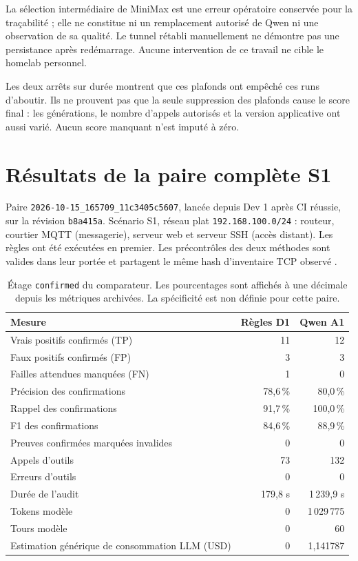 \documentclass[11pt,a4paper]{article}
\newcommand{\code}[1]{\nolinkurl{#1}}
\begin{document}
La sélection intermédiaire de MiniMax est une erreur opératoire conservée pour
la traçabilité ; elle ne constitue ni un remplacement autorisé de Qwen ni une
observation de sa qualité. Le tunnel rétabli manuellement ne démontre pas une
persistance après redémarrage. Aucune intervention de ce travail ne cible le
homelab personnel.

Les deux arrêts sur durée montrent que ces plafonds ont empêché ces runs
d'aboutir. Ils ne prouvent pas que la seule suppression des plafonds cause le
score final : les générations, le nombre d'appels autorisés et la version
applicative ont aussi varié. Aucun score manquant n'est imputé à zéro.

\clearpage
\section{Résultats de la paire complète S1}
Paire \code{2026-10-15_165709_11c3405c5607}, lancée depuis Dev 1 après CI
réussie, sur la révision \code{b8a415a}. Scénario S1, réseau plat
\code{192.168.100.0/24} : routeur, courtier MQTT (messagerie), serveur web et
serveur SSH (accès distant). Les règles ont été exécutées en premier. Les
précontrôles des deux méthodes sont valides dans leur portée et partagent le
même hash d'inventaire TCP observé \cite{resultats}.

\begin{table}[htbp]\centering
\begin{tabularx}{\linewidth}{@{}Yrr@{}}
\toprule
Mesure & Règles D1 & Qwen A1 \\
\midrule
Vrais positifs confirmés (TP) & 11 & 12 \\
Faux positifs confirmés (FP) & 3 & 3 \\
Failles attendues manquées (FN) & 1 & 0 \\
Précision des confirmations & 78,6\,\% & 80,0\,\% \\
Rappel des confirmations & 91,7\,\% & 100,0\,\% \\
F1 des confirmations & 84,6\,\% & 88,9\,\% \\
Preuves confirmées marquées invalides & 0 & 0 \\
Appels d'outils & 73 & 132 \\
Erreurs d'outils & 0 & 0 \\
Durée de l'audit & 179,8 s & 1\,239,9 s \\
Tokens modèle & 0 & 1\,029\,775 \\
Tours modèle & 0 & 60 \\
Estimation générique de consommation LLM (USD) & 0 & 1,141787 \\
\bottomrule
\end{tabularx}
\caption{Étage \code{confirmed} du comparateur. Les pourcentages sont affichés à une décimale depuis les métriques archivées. La spécificité est non définie pour cette paire.}
\label{tab:resultats}
\end{table}
\end{document}
